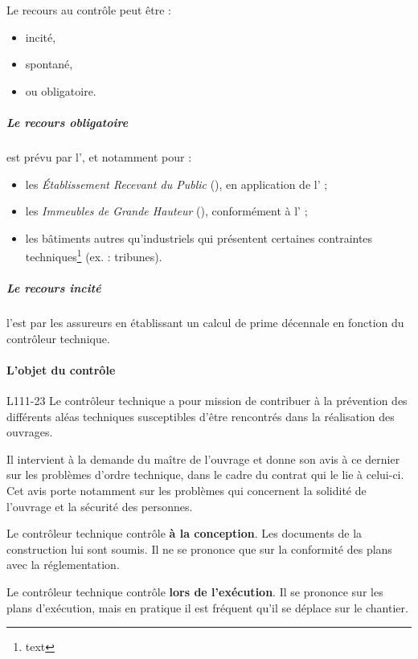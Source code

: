 					Le recours au contrôle peut être :
					\begin{itemize}
						\item incité,
						\item spontané,
						\item ou obligatoire.
					\end{itemize}
				
					\subparagraph{Le recours obligatoire} est prévu par l', et notamment pour :
					\begin{itemize}
						\item les \emph{Établissement Recevant du Public} (\ERP), en application de l' ;
						\item les \emph{Immeubles de Grande Hauteur} (\IGH), conformément à l' ;
						\item les bâtiments autres qu'industriels qui présentent certaines contraintes techniques\footnote{text} (ex. : tribunes).
					\end{itemize}
				
					\subparagraph{Le recours incité} l'est par les assureurs en établissant un calcul de prime décennale en fonction du contrôleur technique.
				
				\paragraph{L'objet du contrôle}
				
					\begin{citationArticle}{L}{111-23}{\cch}
						Le contrôleur technique a pour mission de contribuer à la prévention des différents aléas techniques susceptibles d'être rencontrés dans la réalisation des ouvrages.
						
						Il intervient à la demande du maître de l'ouvrage et donne son avis à ce dernier sur les problèmes d'ordre technique, dans le cadre du contrat qui le lie à celui-ci. Cet avis porte notamment sur les problèmes qui concernent la solidité de l'ouvrage et la sécurité des personnes.
					\end{citationArticle}
				
					Le contrôleur technique contrôle \textbf{à la conception}. Les documents de la construction lui sont soumis. Il ne se prononce que sur la conformité des plans avec la réglementation.
					
					Le contrôleur technique contrôle \textbf{lors de l'exécution}. Il se prononce sur les plans d'exécution, mais en pratique il est fréquent qu'il se déplace sur le chantier.
					
